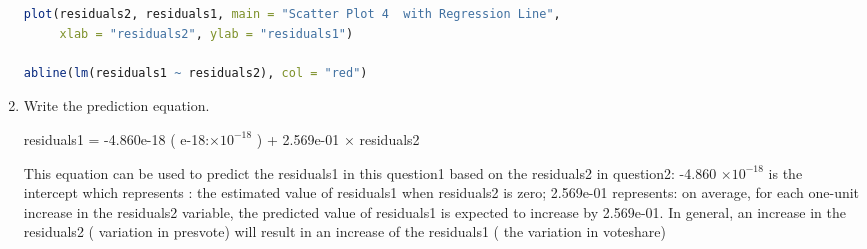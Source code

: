 \documentclass[12pt,letterpaper]{article}
\begin{document}
\begin{enumerate}
\begin{lstlisting}[language=R] 
plot(residuals2, residuals1, main = "Scatter Plot 4  with Regression Line", 
     xlab = "residuals2", ylab = "residuals1")

abline(lm(residuals1 ~ residuals2), col = "red")
\end{lstlisting} 
  
  
		\item Write the prediction equation.

  residuals1 = -4.860e-18 ( e-18:$\times 10^{-18}$ ) + 2.569e-01 × residuals2

  This equation can be used to predict the residuals1 in this question1  based on the residuals2 in question2:  -4.860 $\times 10^{-18}$ is the intercept which represents : the estimated value of residuals1 when residuals2  is zero;  2.569e-01 represents:  on average, for each one-unit increase in the residuals2 variable, the  predicted value of residuals1  is expected to increase by 2.569e-01. In general,  an increase in the residuals2  ( variation in presvote)  will result in an increase of the residuals1  ( the variation in voteshare) 	
  \end{enumerate}
	
	\newpage	
\end{document}
